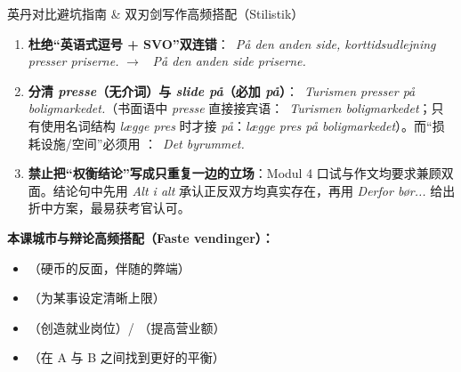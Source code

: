 \begin{grammatikbox}{英丹对比避坑指南 \& 双刃剑写作高频搭配（Stilistik）}
\begin{enumerate}
  \item \textbf{杜绝“英语式逗号 + SVO”双连错}：\ \textit{På den anden side, korttidsudlejning presser priserne.} $\rightarrow$ \ \textit{På den anden side  priserne.}
  \item \textbf{分清 \textit{presse}（无介词）与 \textit{slide på}（必加 \textit{på}）}：\ \textit{Turismen presser på boligmarkedet.}（书面语中 \textit{presse} 直接接宾语：\ \textit{Turismen  boligmarkedet}；只有使用名词结构 \textit{lægge pres} 时才接 \textit{på}：\textit{lægge pres på boligmarkedet}）。而“损耗设施/空间”必须用 ：\ \textit{Det  byrummet.}
  \item \textbf{禁止把“权衡结论”写成只重复一边的立场}：Modul 4 口试与作文均要求兼顾双面。结论句中先用 \textit{Alt i alt} 承认正反双方均真实存在，再用 \textit{Derfor bør...} 给出折中方案，最易获考官认可。
\end{enumerate}

\textbf{本课城市与辩论高频搭配（Faste vendinger）：}
\begin{itemize}
  \item {}（硬币的反面，伴随的弊端）
  \item {}（为某事设定清晰上限）
  \item {}（创造就业岗位）/ （提高营业额）
  \item {}（在 A 与 B 之间找到更好的平衡）
\end{itemize}
\end{grammatikbox}


